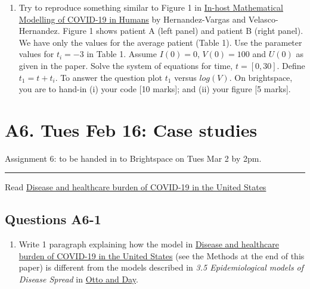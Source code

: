 \documentclass[]{book}
\providecommand{\tightlist}{%
  \setlength{\itemsep}{0pt}\setlength{\parskip}{0pt}}
\begin{document}
\begin{enumerate}
\def\labelenumi{\arabic{enumi}.}
\setcounter{enumi}{1}
\tightlist
\item
  Try to reproduce something similar to Figure 1 in
  \href{https://www-ncbi-nlm-nih-gov.qe2a-proxy.mun.ca/pmc/articles/PMC7526677/}{In-host
  Mathematical Modelling of COVID-19 in Humans} by Hernandez-Vargas and
  Velasco-Hernandez. Figure 1 shows patient A (left panel) and patient B
  (right panel). We have only the values for the average patient (Table
  1). Use the parameter values for \(t_i = -3\) in Table 1. Assume
  \(I(0)=0\), \(V(0) = 100\) and \(U(0)\) as given in the paper. Solve
  the system of equations for time, \(t = [0, 30]\). Define
  \(t_1 = t + t_i\). To answer the question plot \(t_1\) versus
  \(log(V)\). On brightspace, you are to hand-in (i) your code {[}10
  marks{]}; and (ii) your figure {[}5 marks{]}.
\end{enumerate}

\chapter{A6. Tues Feb 16: Case
studies}\label{a6.-tues-feb-16-case-studies}

Assignment 6: to be handed in to Brightspace on Tues Mar 2 by 2pm.

\begin{center}\rule{0.5\linewidth}{0.5pt}\end{center}

Read
\href{https://www-nature-com.qe2a-proxy.mun.ca/articles/s41591-020-0952-y}{Disease
and healthcare burden of COVID-19 in the United States}

\section*{Questions A6-1}\label{questions-a6-1}

\begin{enumerate}
\def\labelenumi{\arabic{enumi}.}
\tightlist
\item
  Write 1 paragraph explaining how the model in
  \href{https://www-nature-com.qe2a-proxy.mun.ca/articles/s41591-020-0952-y}{Disease
  and healthcare burden of COVID-19 in the United States} (see the
  Methods at the end of this paper) is different from the models
  described in \emph{3.5 Epidemiological models of Disease Spread} in
  \href{https://ebookcentral-proquest-com.qe2a-proxy.mun.ca/lib/mun/reader.action?docID=768551\&ppg=93}{Otto
  and Day}.
\end{enumerate}
\end{document}
